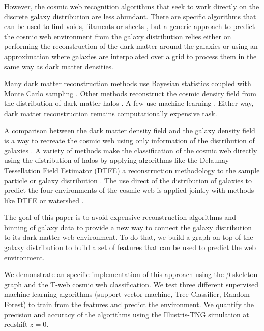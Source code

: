 \documentclass[usenatbib]{mnras}
\begin{document}
However, the cosmic web recognition algorithms that seek to work
directly on the discrete galaxy distribution are less abundant.
There are specific algorithms that can be used to find voids, filaments or sheets \citep{Novikov2003,Platen2007,Zhang2009,Sousbie2010,Chen2015,Luber2019,Aragon-Calvo2019}, but a generic approach to predict the cosmic web
environment from the galaxy distribution relies either on 
performing the reconstruction of the dark matter around the galaxies
or using an approximation where galaxies are interpolated over a 
grid to process them in the same way as dark matter densities.

Many dark matter reconstruction methods use Bayesian statistics
coupled with Monte Carlo sampling
\citep{Jasche2010,Jasche2013a,Bos2014,LeclercqJasche2015,Burchett2020}. Other methods reconstruct the cosmic density field from the distribution of dark matter halos \cite{Wang2009}. A few use machine learning \citep{Hui2018}. Either way, dark matter reconstruction remains computationally expensive task.

A comparison between the dark matter density field and the galaxy density field is a way to recreate the cosmic web using only information of the distribution of galaxies \cite{Wang2016}. A variety of methods make the classification of the cosmic web directly using the distribution of halos by applying algorithms like the Delaunay Tessellation Field Estimator (DTFE) a reconstruction methodology to the sample particle or galaxy distribution \citep{Schaap2007, Platen2011, Aragon-Calvo2007,Cautun2013}. The use direct of the distribution of galaxies to predict the four environments of the cosmic web is applied jointly with methods like DTFE \citep{Cautun2014} or watershed \citep{Aragon-Calvo2010}.

The goal of this paper is to avoid expensive reconstruction algorithms
and binning of galaxy data to provide a new way to connect the galaxy
distribution to its dark matter web environment.
To do that, we build a graph on top of the galaxy distribution 
to build a set of features that can be used to predict the web
environment.

We demonstrate an specific implementation of this approach using 
the $\beta$-skeleton graph \citep{Fang2019} and the 
T-web \citep{Forero-Romero2009} cosmic web classification.
We test three different supervised machine learning
algorithms (support vector machine, Tree Classifier, Random Forest) 
to train from the features and predict the environment.
We quantify the precision and accuracy of the algorithms using 
the Illustris-TNG simulation \citep{Nelson2015} at redshift $z=0$.
\end{document}
